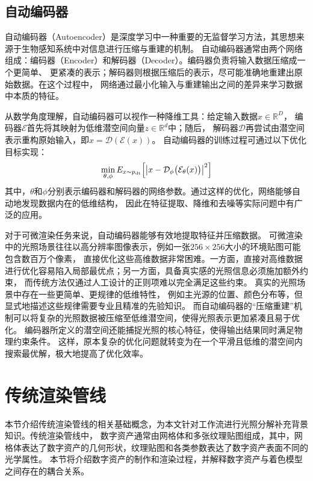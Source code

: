 \subsection{自动编码器} \label{sec:auto_encoder}
自动编码器（Autoencoder）是深度学习中一种重要的无监督学习方法，其思想来源于生物感知系统中对信息进行压缩与重建的机制。
自动编码器通常由两个网络组成：编码器（Encoder）和解码器（Decoder）。编码器负责将输入数据压缩成一个更简单、
更紧凑的表示；解码器则根据压缩后的表示，尽可能准确地重建出原始数据。在这个过程中，
网络通过最小化输入与重建输出之间的差异来学习数据中本质的特征。

从数学角度理解，自动编码器可以视作一种降维工具：给定输入数据$x\in\mathbb{R}^D$，
编码器$\mathcal{E}$首先将其映射为低维潜空间向量$z\in\mathbb{R}^d$中；随后，
解码器$\mathcal{D}$再尝试由潜空间表示重构原始输入，即$\hat{x}=\mathcal{D}\left(\mathcal{E}\left(x\right)\right)$。
自动编码器的训练过程可通过以下优化目标实现：
\begin{equation}\label{eq:ae_loss}
\min_{\theta,\phi}E_{x\sim p_{\mathrm{dt}}}\Bigl[\bigl|x-\mathcal{D}_\phi\bigl(\mathcal{E}_\theta(x)\bigr)\bigr|^2\Bigr]
\end{equation}
其中，$\theta$和$\phi$分别表示编码器和解码器的网络参数。通过这样的优化，网络能够自动地发现数据内在的低维结构，
因此在特征提取、降维和去噪等实际问题中有广泛的应用。

对于可微渲染任务来说，自动编码器能够有效地提取特征并压缩数据。
可微渲染中的光照场景往往以高分辨率图像表示，例如一张$256\times256$大小的环境贴图可能包含数百万个像素，
直接优化这些高维数据非常困难。一方面，直接对高维数据进行优化容易陷入局部最优点；另一方面，具备真实感的光照信息必须施加额外约束，
而传统方法仅通过人工设计的正则项难以完全满足这些约束。
真实的光照场景中存在一些更简单、更规律的低维特性，
例如主光源的位置、颜色分布等，但显式地描述这些规律需要专业且精准的先验知识。
而自动编码器的“压缩重建”机制可以将复杂的光照数据被压缩至低维潜空间，使得光照表示更加紧凑且易于优化。
编码器所定义的潜空间还能捕捉光照的核心特征，使得输出结果同时满足物理约束条件。
这样，原本复杂的优化问题就转变为在一个平滑且低维的潜空间内搜索最优解，极大地提高了优化效率。

\section{传统渲染管线}
本节介绍传统渲染管线的相关基础概念，为本文针对工作流进行光照分解补充背景知识。传统渲染管线中，
数字资产通常由网格体和多张纹理贴图组成，其中，网格体表达了数字资产的几何形状，纹理贴图和各类参数表达了数字资产表面不同的光学属性。
本节将介绍数字资产的制作和渲染过程，并解释数字资产与着色模型之间存在的耦合关系。

